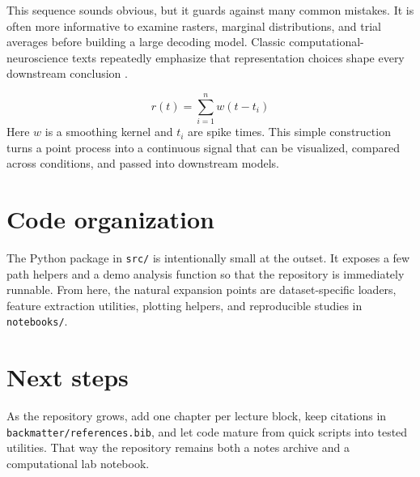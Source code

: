 This sequence sounds obvious, but it guards against many common mistakes. It is often more informative to examine rasters, marginal distributions, and trial averages before building a large decoding model. Classic computational-neuroscience texts repeatedly emphasize that representation choices shape every downstream conclusion \parencite{dayan2001theoretical,gerstner2014neuronal,paninski2007statistical}.

\begin{keyequation}
\[
r(t) = \sum_{i=1}^{n} w(t-t_i)
\]
\tcblower
Here $w$ is a smoothing kernel and $t_i$ are spike times. This simple construction turns a point process into a continuous signal that can be visualized, compared across conditions, and passed into downstream models.
\end{keyequation}

\section{Code organization}

The Python package in \texttt{src/} is intentionally small at the outset. It exposes a few path helpers and a demo analysis function so that the repository is immediately runnable. From here, the natural expansion points are dataset-specific loaders, feature extraction utilities, plotting helpers, and reproducible studies in \texttt{notebooks/}.

\section{Next steps}

As the repository grows, add one chapter per lecture block, keep citations in \texttt{backmatter/references.bib}, and let code mature from quick scripts into tested utilities. That way the repository remains both a notes archive and a computational lab notebook.
